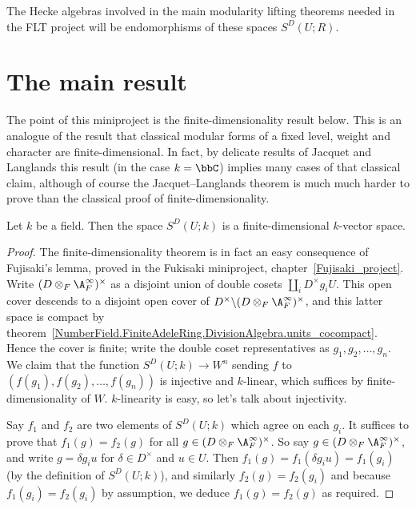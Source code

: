 The Hecke algebras involved in the main modularity lifting
theorems needed in the FLT project will be endomorphisms of these spaces $S^D(U;R)$.

\section{The main result}

The point of this miniproject is the finite-dimensionality result below.
This is an analogue of the result that classical modular forms of a fixed
level, weight and character are finite-dimensional. In fact, by delicate results
of Jacquet and Langlands this result (in the case $k=\bbC$) implies many cases of that classical claim,
although of course the Jacquet--Langlands theorem is much much harder to prove than the classical
proof of finite-dimensionality.


\begin{theorem}
  \label{TotallyDefiniteQuaternionAlgebra.WeightTwoAutomorphicForm.finiteDimensional}
  Let $k$ be a field. Then the space $S^D(U;k)$ is a finite-dimensional $k$-vector space.
\end{theorem}



\begin{proof}
  The finite-dimensionality theorem is in fact an easy consequence of Fujisaki's lemma,
  proved in the Fukisaki miniproject, chapter~\ref{Fujisaki_project}.
  Write $(D\otimes_F\A_F^\infty)^\times$ as a disjoint union of double cosets
  $\coprod_i D^\times g_i U$. This open cover descends to a disjoint open
  cover of $D^\times\backslash (D\otimes_F\A_F^\infty)^\times$,
  and this latter space is compact by theorem~\ref{NumberField.FiniteAdeleRing.DivisionAlgebra.units_cocompact}.
  Hence the cover is finite; write the double coset representatives
  as $g_1,g_2,\ldots,g_n$. We claim that
  the function $S^D(U;k)\to W^n$ sending $f$ to $(f(g_1),f(g_2),\ldots,f(g_n))$
  is injective and $k$-linear, which suffices by finite-dimensionality of $W$.
  $k$-linearity is easy, so let's talk about injectivity.

  Say $f_1$ and $f_2$ are two elements of $S^D(U;k)$ which agree on
  each $g_i$. It suffices to prove that $f_1(g)=f_2(g)$ for all
  $g\in(D\otimes_F\A_F^\infty)^\times$. So say $g\in(D\otimes_F\A_F^\infty)^\times$,
  and write $g=\delta g_iu$ for $\delta \in D^\times$ and $u\in U$.
  Then $f_1(g)=f_1(\delta g_iu)=f_1(g_i)$ (by the definition of $S^D(U;k)$), and similarly $f_2(g)=f_2(g_i)$
  and because $f_1(g_i)=f_2(g_i)$ by assumption, we deduce $f_1(g)=f_2(g)$ as required.
\end{proof}
